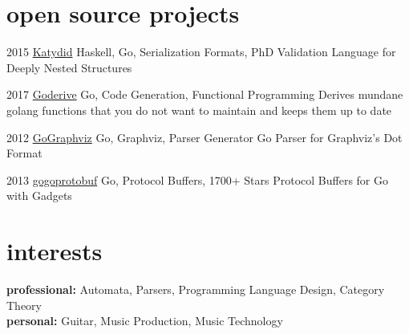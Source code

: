 \documentclass[print]{friggeri-cv-a4} %
\begin{document}
\section{open source projects}

\begin{entrylist}

\entry
{2015}
{\href{https://github.com/katydid/katydid}{Katydid}}
{Haskell, Go, Serialization Formats, PhD}
{Validation Language for Deeply Nested Structures}

\entry
{2017}
{\href{https://github.com/awalterschulze/goderive}{Goderive}}
{Go, Code Generation, Functional Programming}
{Derives mundane golang functions that you do not want to maintain and keeps them up to date}

\entry
{2012}
{\href{https://github.com/awalterschulze/gographviz}{GoGraphviz}}
{Go, Graphviz, Parser Generator}
{Go Parser for Graphviz's Dot Format}

\entry
{2013}
{\href{https://github.com/gogo/protobuf}{gogoprotobuf}}
{Go, Protocol Buffers, 1700+ Stars}
{Protocol Buffers for Go with Gadgets}

\end{entrylist}

\section{interests}

\textbf{professional:} Automata, Parsers, Programming Language Design, Category Theory \\
\textbf{personal:} Guitar, Music Production, Music Technology
\end{document}
